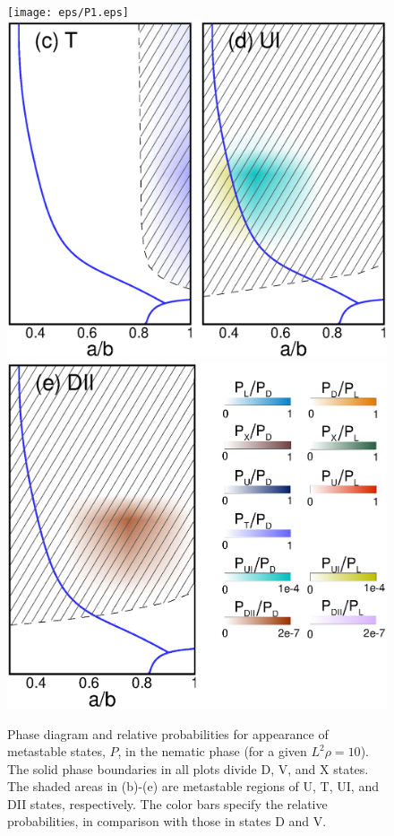 \documentclass[prl,twocolumn,preprintnumbers,reprint]{revtex4}
\begin{document}
\begin{figure}[!t]\centering
\texttt{[image: eps/P1.eps]}
\includegraphics[scale=0.295]{eps/P2.eps}
\includegraphics[scale=0.295]{eps/P3.eps}
\caption{Phase diagram and relative probabilities for appearance of metastable states, $P$, in the nematic phase (for a given $L^2\rho = 10$). The solid phase boundaries in all plots divide D, V, and X states. The shaded areas in (b)-(e) are metastable regions of U, T, UI, and DII states, respectively. The color bars specify the relative probabilities, in comparison with those in states D  and V.} \label{Phase}
\end{figure}
\end{document}
